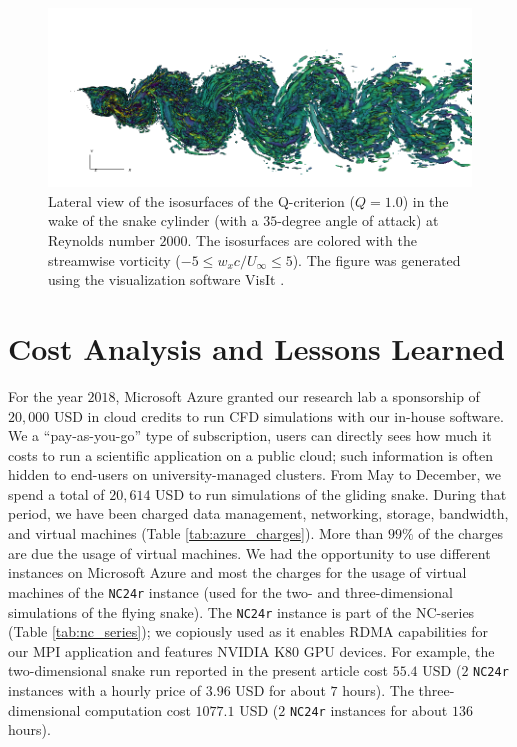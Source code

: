 \documentclass[10pt,journal,compsoc]{IEEEtran}
\begin{document}
\begin{figure}[!h]
    \centering
    \includegraphics[width=16cm]{figures/qcrit_wx_wake3d_0020.png}
    \caption{Lateral view of the isosurfaces of the Q-criterion ($Q = 1.0$) in the wake of the snake cylinder (with a $35$-degree angle of attack) at Reynolds number $2000$. The isosurfaces are colored with the streamwise vorticity ($-5 \leq w_x c / U_\infty \leq 5$). The figure was generated using the visualization software VisIt \cite{childs_et_al_2012}.}
    \label{fig:qcrit_wx_3d}
\end{figure}

\section{Cost Analysis and Lessons Learned}\label{sec:cost}


For the year $2018$, Microsoft Azure granted our research lab a sponsorship of $20,000$ USD in cloud credits to run CFD simulations with our in-house software.
We a ``pay-as-you-go'' type of subscription, users can directly sees how much it costs to run a scientific application on a public cloud; such information is often hidden to end-users on university-managed clusters.
From May to December, we spend a total of $20,614$ USD to run simulations of the gliding snake.
During that period, we have been charged data management, networking, storage, bandwidth, and virtual machines (Table \ref{tab:azure_charges}).
More than $99\%$ of the charges are due the usage of virtual machines.
We had the opportunity to use different instances on Microsoft Azure and most the charges for the usage of virtual machines of the \texttt{NC24r} instance (used for the two- and three-dimensional simulations of the flying snake).
The \texttt{NC24r} instance is part of the NC-series (Table \ref{tab:nc_series}); we copiously used as it enables RDMA capabilities for our MPI application and features NVIDIA K80 GPU devices.
For example, the two-dimensional snake run reported in the present article cost $55.4$ USD ($2$ \texttt{NC24r} instances with a hourly price of $3.96$ USD for about $7$ hours).
The three-dimensional computation cost $1077.1$ USD ($2$ \texttt{NC24r} instances for about $136$ hours).
\end{document}

